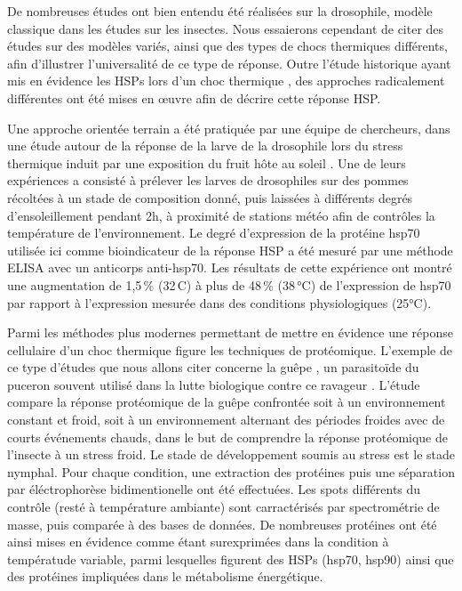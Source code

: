 

		De nombreuses études ont bien entendu été réalisées sur la drosophile, modèle classique dans les études sur les insectes.
		Nous essaierons cependant de citer des études sur des modèles variés, ainsi que des types de chocs thermiques différents, afin d'illustrer l'universalité de ce type de réponse.
		Outre l'étude historique ayant mis en évidence les HSPs lors d'un choc thermique \cite{tissieres1974}, 
		des approches radicalement différentes ont été mises en \oe{}uvre afin de décrire cette réponse HSP.

		Une approche orientée terrain a été pratiquée par une équipe de chercheurs, dans une étude autour de la réponse de la larve de la drosophile lors du stress thermique induit par une exposition du fruit hôte au soleil \cite{feder1997}.
		Une de leurs expériences a consisté à prélever les larves de drosophiles sur des pommes récoltées à un stade de composition donné, puis laissées à différents degrés d'ensoleillement pendant 2h, à proximité de stations météo afin de contrôles la température de l'environnement.
		Le degré d'expression de la protéine hsp70 utilisée ici comme bioindicateur de la réponse HSP a été mesuré par une méthode ELISA avec un anticorps anti-hsp70.
		Les résultats de cette expérience ont montré une augmentation de 1,5\,\% (32\,\degres{}C) à plus de 48\,\% (38\,°C) de l'expression de hsp70 par rapport à l'expression mesurée dans des conditions physiologiques (25°C). %

		Parmi les méthodes plus modernes permettant de mettre en évidence une réponse cellulaire d'un choc thermique figure les techniques de protéomique.
		L'exemple de ce type d'études que nous allons citer concerne la guêpe , un parasitoïde du puceron souvent utilisé dans la lutte biologique contre ce ravageur \cite{colinet2007}.
		L'étude compare la réponse protéomique de la guêpe confrontée soit à un environnement constant et froid, soit à un environnement alternant des périodes froides avec de courts événements chauds, dans le but de comprendre la réponse protéomique de l'insecte à un stress froid.
		Le stade de développement soumis au stress est le stade nymphal.
		Pour chaque condition, une extraction des protéines puis une séparation par éléctrophorèse bidimentionelle ont été effectuées.
		Les spots différents du contrôle (resté à température ambiante) sont carractérisés par spectrométrie de masse, puis comparée à des bases de données.
		De nombreuses protéines ont été ainsi mises en évidence comme étant surexprimées dans la condition à températude variable, parmi lesquelles figurent des HSPs (hsp70, hsp90) ainsi que des protéines impliquées dans le métabolisme énergétique.

